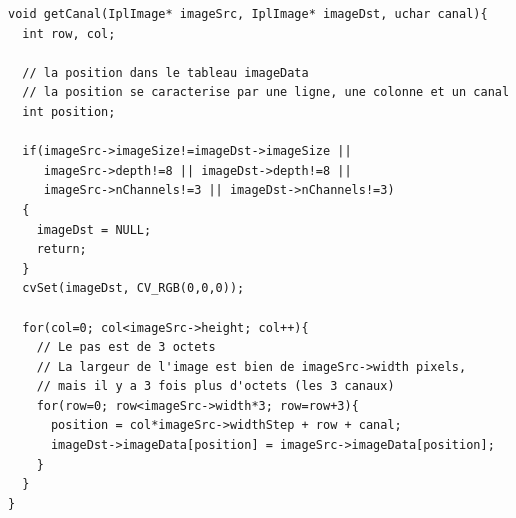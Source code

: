 \begin{lstlisting}[caption=Fonction getCanal avec OpenCV]
void getCanal(IplImage* imageSrc, IplImage* imageDst, uchar canal){
  int row, col;

  // la position dans le tableau imageData
  // la position se caracterise par une ligne, une colonne et un canal
  int position;

  if(imageSrc->imageSize!=imageDst->imageSize ||
     imageSrc->depth!=8 || imageDst->depth!=8 ||
     imageSrc->nChannels!=3 || imageDst->nChannels!=3)
  {
    imageDst = NULL;
    return;
  }
  cvSet(imageDst, CV_RGB(0,0,0));

  for(col=0; col<imageSrc->height; col++){
    // Le pas est de 3 octets
    // La largeur de l'image est bien de imageSrc->width pixels, 
    // mais il y a 3 fois plus d'octets (les 3 canaux)
    for(row=0; row<imageSrc->width*3; row=row+3){
      position = col*imageSrc->widthStep + row + canal;
      imageDst->imageData[position] = imageSrc->imageData[position];
    }
  }
}
\end{lstlisting}
